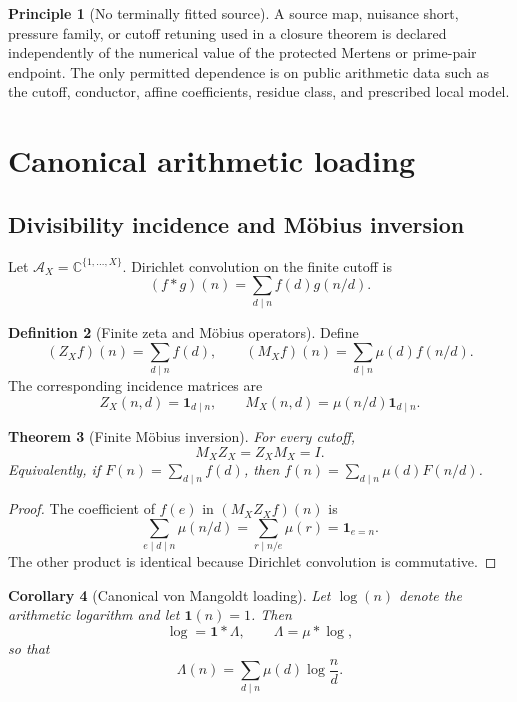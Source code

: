 \documentclass[11pt]{article}
\newtheorem{theorem}{Theorem}[section]
\newtheorem{corollary}[theorem]{Corollary}
\theoremstyle{definition}
\newtheorem{definition}[theorem]{Definition}
\newtheorem{principle}[theorem]{Principle}
\theoremstyle{remark}
\newcommand{\C}{\mathbb C}
\newcommand{\one}{\mathbf 1}
\begin{document}
\begin{principle}[No terminally fitted source]
A source map, nuisance short, pressure family, or cutoff retuning used in a
closure theorem is declared independently of the numerical value of the
protected Mertens or prime-pair endpoint.  The only permitted dependence is on
public arithmetic data such as the cutoff, conductor, affine coefficients,
residue class, and prescribed local model.
\end{principle}


\section{Canonical arithmetic loading}
\label{sec:arithmetic-loading}

\subsection{Divisibility incidence and M\"obius inversion}

Let $\mathcal A_X=\C^{\{1,\ldots,X\}}$.  Dirichlet convolution on the finite
cutoff is
\[
 (f*g)(n)=\sum_{d\mid n}f(d)g(n/d).
\]

\begin{definition}[Finite zeta and M\"obius operators]
Define
\[
 (Z_Xf)(n)=\sum_{d\mid n}f(d),
 \qquad
 (M_Xf)(n)=\sum_{d\mid n}\mu(d)f(n/d).
\]
The corresponding incidence matrices are
\[
 Z_X(n,d)=\one_{d\mid n},
 \qquad
 M_X(n,d)=\mu(n/d)\one_{d\mid n}.
\]
\end{definition}

\begin{theorem}[Finite M\"obius inversion]
\label{thm:finite-mobius}
For every cutoff,
\[
 M_XZ_X=Z_XM_X=I.
\]
Equivalently, if $F(n)=\sum_{d\mid n}f(d)$, then
$f(n)=\sum_{d\mid n}\mu(d)F(n/d)$.
\end{theorem}

\begin{proof}
The coefficient of $f(e)$ in $(M_XZ_Xf)(n)$ is
\[
 \sum_{e\mid d\mid n}\mu(n/d)
 =\sum_{r\mid n/e}\mu(r)
 =\one_{e=n}.
\]
The other product is identical because Dirichlet convolution is commutative.
\end{proof}

\begin{corollary}[Canonical von Mangoldt loading]
\label{cor:lambda-mu-log}
Let $\log(n)$ denote the arithmetic logarithm and let $\one(n)=1$.  Then
\[
 \log=\one*\Lambda,
 \qquad
 \boxed{\Lambda=\mu*\log},
\]
so that
\[
 \Lambda(n)=\sum_{d\mid n}\mu(d)\log\frac nd.
\]
\end{corollary}
\end{document}
